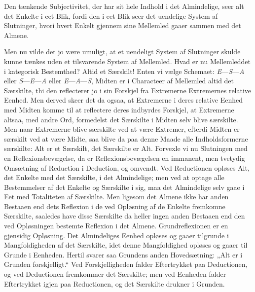 \documentclass[12pt]{book}
\newcommand{\opage}[1]{\marginnote{\footnotesize\textit{[#1]}}}
\begin{document}
Den tænkende Subjectivitet, der har sit hele Indhold i det Almindelige, seer alt det Enkelte i eet Blik, fordi den i eet Blik seer det uendelige System af Slutninger, hvori hvert Enkelt gjennem sine Mellemled gaaer sammen med det Almene.

Men nu vilde det jo være umuligt, at et uendeligt System af Slutninger skulde kunne tænkes uden et tilsvarende System af Mellemled. Hvad er nu Mellemleddet i kategorisk Bestemthed? Altid et Særskilt! Enten vi vælge Schemaet: \textit{E}---\textit{S}---\textit{A} eller \textit{S}---\textit{E}---\textit{A} eller \textit{E}---\textit{A}---\textit{S}, Midten er i Characteer af Mellemled altid det Særskilte, thi den reflecterer jo i sin Forskjel fra Extremerne Extremernes relative Eenhed. Men derved skeer det da ogsaa, at Extremerne i deres relative Eenhed med Midten komme til at reflectere deres indbyrdes Forskjel, at Extremerne altsaa, med andre Ord, formedelst det Særskilte i Midten selv blive særskilte. Men naar Extremerne blive særskilte ved at være Extremer, efterdi Midten er særskilt ved at være Midte, saa blive da paa denne Maade alle Indholdsformerne særskilte: Alt er et Særskilt, det Særskilte er
\opage{355}Alt. Forvexle vi nu Slutningen med en Reflexionsbevægelse, da er Reflexionsbevægelsen en immanent, men tvetydig Omsætning af Reduction i Deduction, og omvendt. Ved Reductionen opløses Alt, det Enkelte med det Særskilte, i det Almindelige; men ved at optage alle Bestemmelser af det Enkelte og Særskilte i sig, maa det Almindelige selv gaae i Eet med Totaliteten af Særskilte. Men ligesom det Almene ikke har anden Bestaaen end dets Reflexion i de ved Opløsning af de Enkelte fremkomne Særskilte, saaledes have disse Særskilte da heller ingen anden Bestaaen end den ved Opløsningen bestemte Reflexion i det Almene. Grundreflexionen er en gjensidig Opløsning. Det Almindeliges Eenhed opløses og gaaer tilgrunde i Mangfoldigheden af det Særskilte, idet denne Mangfoldighed opløses og gaaer til Grunde i Eenheden. Hertil svarer saa Grundens anden Hovedsætning: „Alt er i Grunden forskjelligt.“ Ved Forskjelligheden falder Eftertrykket paa Deductionen, og ved Deductionen fremkommer det Særskilte; men ved Eenheden falder Eftertrykket igjen paa Reductionen, og det Særskilte drukner i Grunden.
\end{document}
